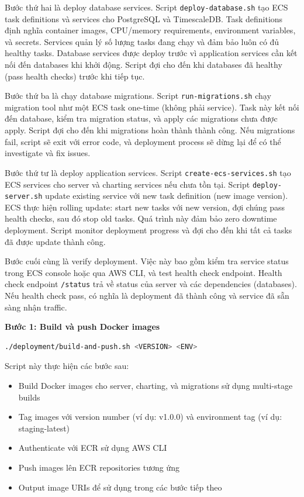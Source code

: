 Bước thứ hai là deploy database services. Script \texttt{deploy-database.sh} tạo ECS task definitions và services cho PostgreSQL và TimescaleDB. Task definitions định nghĩa container images, CPU/memory requirements, environment variables, và secrets. Services quản lý số lượng tasks đang chạy và đảm bảo luôn có đủ healthy tasks. Database services được deploy trước vì application services cần kết nối đến databases khi khởi động. Script đợi cho đến khi databases đã healthy (pass health checks) trước khi tiếp tục.

Bước thứ ba là chạy database migrations. Script \texttt{run-migrations.sh} chạy migration tool như một ECS task one-time (không phải service). Task này kết nối đến database, kiểm tra migration status, và apply các migrations chưa được apply. Script đợi cho đến khi migrations hoàn thành thành công. Nếu migrations fail, script sẽ exit với error code, và deployment process sẽ dừng lại để có thể investigate và fix issues.

Bước thứ tư là deploy application services. Script \texttt{create-ecs-services.sh} tạo ECS services cho server và charting services nếu chưa tồn tại. Script \texttt{deploy-server.sh} update existing service với new task definition (new image version). ECS thực hiện rolling update: start new tasks với new version, đợi chúng pass health checks, sau đó stop old tasks. Quá trình này đảm bảo zero downtime deployment. Script monitor deployment progress và đợi cho đến khi tất cả tasks đã được update thành công.

Bước cuối cùng là verify deployment. Việc này bao gồm kiểm tra service status trong ECS console hoặc qua AWS CLI, và test health check endpoint. Health check endpoint \texttt{/status} trả về status của server và các dependencies (databases). Nếu health check pass, có nghĩa là deployment đã thành công và service đã sẵn sàng nhận traffic.

\textbf{Bước 1: Build và push Docker images}
\begin{lstlisting}[language=bash, caption=Build và push images]
./deployment/build-and-push.sh <VERSION> <ENV>
\end{lstlisting}

Script này thực hiện các bước sau:
\begin{itemize}
    \item Build Docker images cho server, charting, và migrations sử dụng multi-stage builds
    \item Tag images với version number (ví dụ: v1.0.0) và environment tag (ví dụ: staging-latest)
    \item Authenticate với ECR sử dụng AWS CLI
    \item Push images lên ECR repositories tương ứng
    \item Output image URIs để sử dụng trong các bước tiếp theo
\end{itemize}

